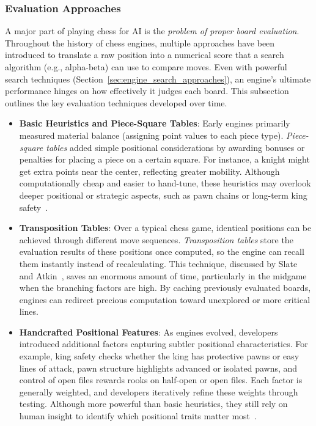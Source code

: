 \documentclass[12pt,a4paper]{article}
\begin{document}
\subsubsection{Evaluation Approaches}
\label{sec:evaluation_approaches}

A major part of playing chess for AI is the \emph{problem of proper board evaluation}. Throughout the history of chess engines, multiple approaches have been introduced to translate a raw position into a numerical score that a search algorithm (e.g., alpha-beta) can use to compare moves. Even with powerful search techniques (Section~\ref{sec:engine_search_approaches}), an engine’s ultimate performance hinges on how effectively it judges each board. This subsection outlines the key evaluation techniques developed over time.

\begin{itemize}
  \item \textbf{Basic Heuristics and Piece-Square Tables}:  
  Early engines primarily measured material balance (assigning point values to each piece type). \emph{Piece-square tables} added simple positional considerations by awarding bonuses or penalties for placing a piece on a certain square. For instance, a knight might get extra points near the center, reflecting greater mobility. Although computationally cheap and easier to hand-tune, these heuristics may overlook deeper positional or strategic aspects, such as pawn chains or long-term king safety~\cite{Shannon1950}.

  \item \textbf{Transposition Tables}:  
  Over a typical chess game, identical positions can be achieved through different move sequences. \emph{Transposition tables} store the evaluation results of these positions once computed, so the engine can recall them instantly instead of recalculating. This technique, discussed by Slate and Atkin~\cite{Slate1977}, saves an enormous amount of time, particularly in the midgame when the branching factors are high. By caching previously evaluated boards, engines can redirect precious computation toward unexplored or more critical lines.

  \item \textbf{Handcrafted Positional Features}:  
  As engines evolved, developers introduced additional factors capturing subtler positional characteristics. For example, king safety checks whether the king has protective pawns or easy lines of attack, pawn structure highlights advanced or isolated pawns, and control of open files rewards rooks on half-open or open files. Each factor is generally weighted, and developers iteratively refine these weights through testing. Although more powerful than basic heuristics, they still rely on human insight to identify which positional traits matter most~\cite{LevyNewborn1991}.



\end{itemize}
\end{document}
